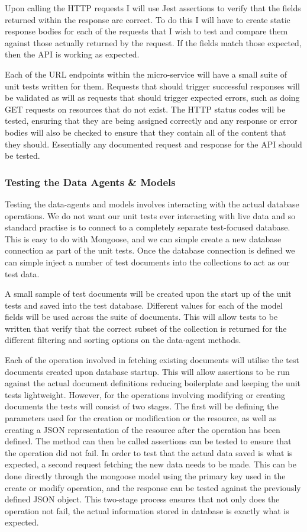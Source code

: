 Upon calling the HTTP requests I will use Jest assertions to verify that the fields returned within the response are correct. To do this I will have to create static response bodies for each of the requests that I wish to test and compare them against those actually returned by the request. If the fields match those expected, then the API is working as expected.

Each of the URL endpoints within the micro-service will have a small suite of unit tests written for them. Requests that should trigger successful responses will be validated as will as requests that should trigger expected errors, such as doing GET requests on resources that do not exist. The HTTP status codes will be tested, ensuring that they are being assigned correctly and any response or error bodies will also be checked to ensure that they contain all of the content that they should. Essentially any documented request and response for the API should be tested.
\subsubsection{Testing the Data Agents \& Models}
Testing the data-agents and models involves interacting with the actual database operations. We do not want our unit tests ever interacting with live data and so standard practise is to connect to a completely separate test-focused database. This is easy to do with Mongoose, and we can simple create a new database connection as part of the unit tests. Once the database connection is defined we can simple inject a number of test documents into the collections to act as our test data.

A small sample of test documents will be created upon the start up of the unit tests and saved into the test database. Different values for each of the model fields will be used across the suite of documents. This will allow tests to be written that verify that the correct subset of the collection is returned for the different filtering and sorting options on the data-agent methods.

Each of the operation involved in fetching existing documents will utilise the test documents created upon database startup. This will allow assertions to be run against the actual document definitions reducing boilerplate and keeping the unit tests lightweight. However, for the operations involving modifying or creating documents the tests will consist of two stages. The first will be defining the parameters used for the creation or modification or the resource, as well as creating a JSON representation of the resource after the operation has been defined. The method can then be called assertions can be tested to ensure that the operation did not fail. In order to test that the actual data saved is what is expected, a second request fetching the new data needs to be made. This can be done directly through the mongoose model using the primary key used in the create or modify operation, and the response can be tested against the previously defined JSON object. This two-stage process ensures that not only does the operation not fail, the actual information stored in database is exactly what is expected.
